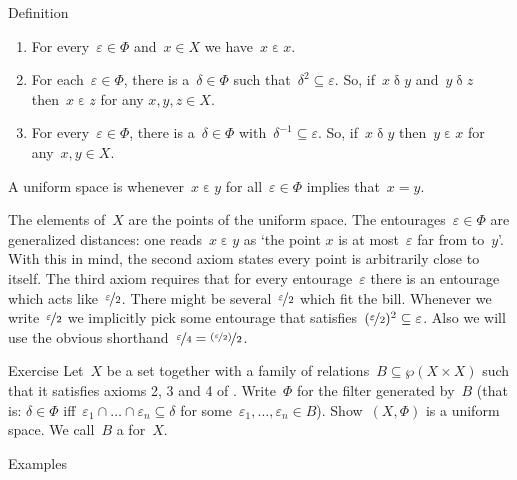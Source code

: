 \documentclass[b]{subfiles}
\begin{document}
\begin{parsec}
\begin{point}{Definition}
\begin{enumerate}
\begin{inparaenum}
        \end{inparaenum}
    \item
        For every~$\varepsilon \in \Phi$
            and~$x \in X$ we have~$x \mathrel\varepsilon x$.
    \item
        For each~$\varepsilon \in \Phi$,
            there is a~$\delta \in \Phi$
            such that~$\delta^2 \subseteq \varepsilon$.
        So, if~$x \mathrel\delta y$ and~$y \mathrel\delta z$
            then~$x \mathrel\varepsilon z$ for any $x,y,z \in X$.
    \item
        For every~$\varepsilon \in \Phi$,
            there is a~$\delta \in \Phi$
                with~$\delta^{-1}\subseteq \varepsilon$.
        So, if~$x \mathrel\delta y$ then~$y \mathrel\varepsilon x$
            for any~$x,y \in X$.
    \end{enumerate}
    A uniform space is 
        whenever~$x \mathrel\varepsilon y$
            for all~$\varepsilon \in \Phi$
            implies that~$x=y$.
\begin{point}%
The elements of~$X$ are the points of the uniform space.
The entourages~$\varepsilon \in \Phi$
    are generalized distances:
one reads~$x \mathrel\varepsilon y$ as
    `the point $x$ is at most~$\varepsilon$ far from to~$y$'.
With this in mind, the second axiom states every point is arbitrarily close
    to itself.
The third axiom requires that for every entourage~$\varepsilon$
    there is an entourage which acts like~$\nicefrac{\varepsilon}{2}$.
There might be several~$\nicefrac{\varepsilon}{2}$
    which fit the bill.
Whenever we write~$\nicefrac{\varepsilon}{2}$
    we implicitly pick some entourage that
    satisfies~$(\nicefrac{\varepsilon}{2})^2 \subseteq \varepsilon$.
Also we will use the obvious shorthand~$\nicefrac{\varepsilon}{4}
=   \nicefrac{(\nicefrac{\varepsilon}{2})}{2}$.
\end{point}
\end{point}
\begin{point}{Exercise}%
Let~$X$ be a set together with
    a family of relations~$B \subseteq \wp (X \times X)$
    such that it satisfies axioms 2, 3 and 4
    of .
Write~$\Phi$ for the filter generated by~$B$
    (that is: $\delta \in \Phi$
        iff~$\varepsilon_1 \cap \ldots \cap \varepsilon_n \subseteq \delta$
            for some~$\varepsilon_1, \ldots, \varepsilon_n \in B$).
Show~$(X,\Phi)$ is a uniform space.
We call~$B$ a  for~$X$.
\end{point}
\begin{point}{Examples}%

\end{point}
\end{parsec}
\end{document}
